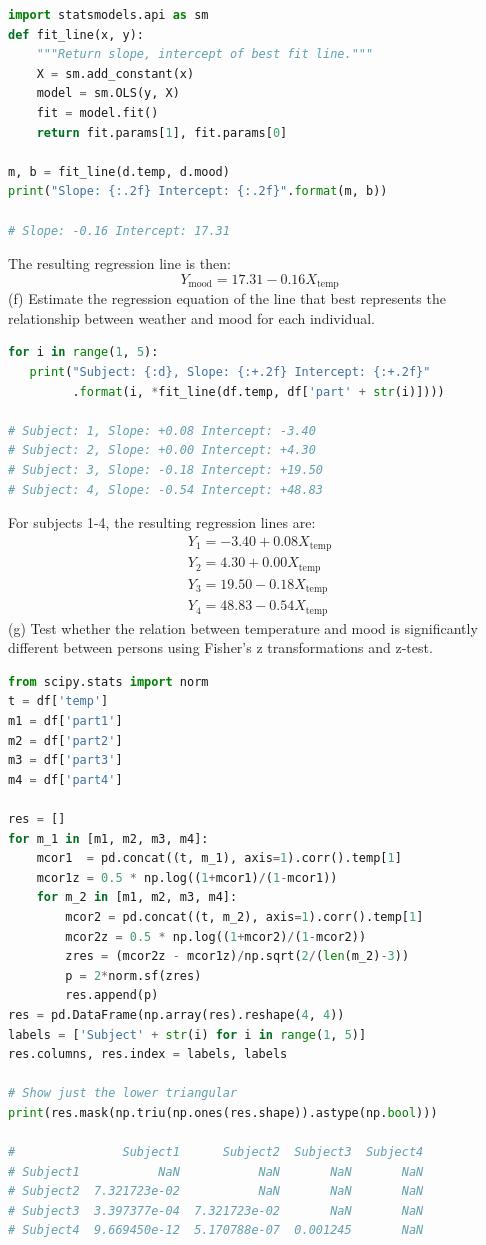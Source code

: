 \documentclass[onecolumn,10pt]{jhwhw}
\begin{document}
\begin{lstlisting}[language=Python]
import statsmodels.api as sm
def fit_line(x, y):
    """Return slope, intercept of best fit line."""
    X = sm.add_constant(x)
    model = sm.OLS(y, X)
    fit = model.fit()
    return fit.params[1], fit.params[0]

m, b = fit_line(d.temp, d.mood)
print("Slope: {:.2f} Intercept: {:.2f}".format(m, b))

# Slope: -0.16 Intercept: 17.31
\end{lstlisting}
The resulting regression line is then:
$$
Y_{\mbox{mood}} = 17.31 - 0.16 X_{\mbox{temp}}
$$
(f) Estimate the regression equation of the line that best represents the relationship between weather and mood for each individual.
\begin{lstlisting}[language=Python]
for i in range(1, 5):
   print("Subject: {:d}, Slope: {:+.2f} Intercept: {:+.2f}"
         .format(i, *fit_line(df.temp, df['part' + str(i)])))

# Subject: 1, Slope: +0.08 Intercept: -3.40
# Subject: 2, Slope: +0.00 Intercept: +4.30
# Subject: 3, Slope: -0.18 Intercept: +19.50
# Subject: 4, Slope: -0.54 Intercept: +48.83
\end{lstlisting}
For subjects 1-4, the resulting regression lines are:
\begin{align*}
Y_{1} = -3.40  +0.08 X_{\mbox{temp}}\\
Y_{2} = 4.30  +0.00 X_{\mbox{temp}}\\
Y_{3} = 19.50 -0.18 X_{\mbox{temp}}\\
Y_{4} = 48.83 -0.54 X_{\mbox{temp}}
\end{align*}
(g) Test whether the relation between temperature and mood is significantly different between persons using Fisher's z transformations and z-test.
\begin{lstlisting}[language=Python]
from scipy.stats import norm
t = df['temp']
m1 = df['part1']
m2 = df['part2']
m3 = df['part3']
m4 = df['part4']

res = []
for m_1 in [m1, m2, m3, m4]:
    mcor1  = pd.concat((t, m_1), axis=1).corr().temp[1]
    mcor1z = 0.5 * np.log((1+mcor1)/(1-mcor1))
    for m_2 in [m1, m2, m3, m4]:
        mcor2 = pd.concat((t, m_2), axis=1).corr().temp[1]
        mcor2z = 0.5 * np.log((1+mcor2)/(1-mcor2))
        zres = (mcor2z - mcor1z)/np.sqrt(2/(len(m_2)-3))
        p = 2*norm.sf(zres)
        res.append(p)
res = pd.DataFrame(np.array(res).reshape(4, 4))
labels = ['Subject' + str(i) for i in range(1, 5)]
res.columns, res.index = labels, labels

# Show just the lower triangular
print(res.mask(np.triu(np.ones(res.shape)).astype(np.bool)))

#               Subject1      Subject2  Subject3  Subject4
# Subject1           NaN           NaN       NaN       NaN
# Subject2  7.321723e-02           NaN       NaN       NaN
# Subject3  3.397377e-04  7.321723e-02       NaN       NaN
# Subject4  9.669450e-12  5.170788e-07  0.001245       NaN
\end{lstlisting}
\end{document}
